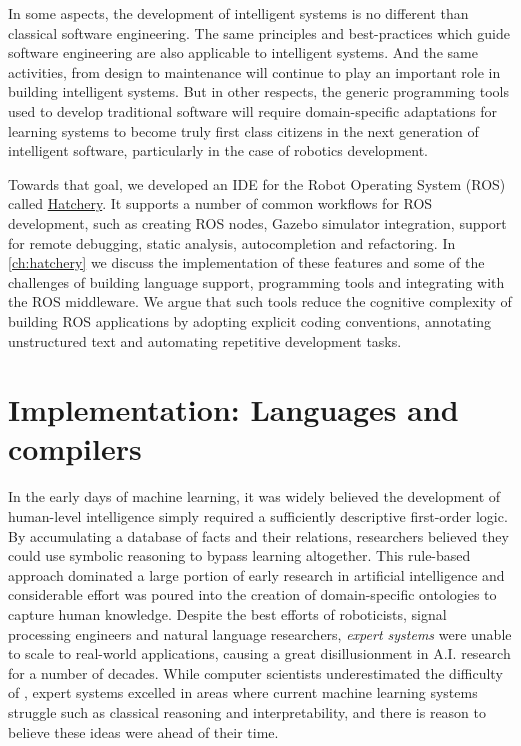 \documentclass[12pt,initial,twoside,maitrise]{dms}
\numberwithin{equation}{section}
\numberwithin{table}{chapter}
\numberwithin{figure}{chapter}
\begin{document}
In some aspects, the development of intelligent systems is no different than classical software engineering. The same principles and best-practices which guide software engineering are also applicable to intelligent systems. And the same activities, from design to maintenance will continue to play an important role in building intelligent systems. But in other respects, the generic programming tools used to develop traditional software will require domain-specific adaptations for learning systems to become truly first class citizens in the next generation of intelligent software, particularly in the case of robotics development.

Towards that goal, we developed an IDE for the Robot Operating System (ROS) called \href{https://github.com/duckietown/hatchery}{Hatchery}. It supports a number of common workflows for ROS development, such as creating ROS nodes, Gazebo simulator integration, support for remote debugging, static analysis, autocompletion and refactoring. In \autoref{ch:hatchery} we discuss the implementation of these features and some of the challenges of building language support, programming tools and integrating with the ROS middleware. We argue that such tools reduce the cognitive complexity of building ROS applications by adopting explicit coding conventions, annotating unstructured text and automating repetitive development tasks.

\section{Implementation: Languages and compilers}

In the early days of machine learning, it was widely believed the development of human-level intelligence simply required a sufficiently descriptive first-order logic. By accumulating a database of facts and their relations, researchers believed they could use symbolic reasoning to bypass learning altogether. This rule-based approach dominated a large portion of early research in artificial intelligence and considerable effort was poured into the creation of domain-specific ontologies to capture human knowledge. Despite the best efforts of roboticists, signal processing engineers and natural language researchers, \textit{expert systems} were unable to scale to real-world applications, causing a great disillusionment in A.I. research for a number of decades. While computer scientists underestimated the difficulty of , expert systems excelled in areas where current machine learning systems struggle such as classical reasoning and interpretability, and there is reason to believe these ideas were ahead of their time.
\end{document}
